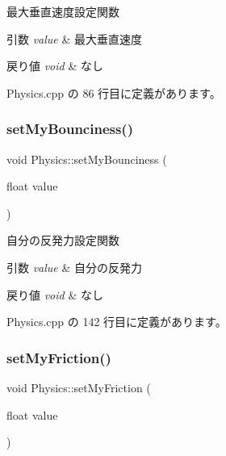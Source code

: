 最大垂直速度設定関数 


\begin{DoxyParams}{引数}
{\em value} & 最大垂直速度 \\
\hline
\end{DoxyParams}

\begin{DoxyRetVals}{戻り値}
{\em void} & なし \\
\hline
\end{DoxyRetVals}


 Physics.\+cpp の 86 行目に定義があります。

\mbox{\label{class_physics_a4e23a9b6f9888b22d3043ea8463fbd37}} 
\subsubsection{\texorpdfstring{set\+My\+Bounciness()}{setMyBounciness()}}
{\footnotesize\ttfamily void Physics\+::set\+My\+Bounciness (\begin{DoxyParamCaption}\item[{float}]{value }\end{DoxyParamCaption})}



自分の反発力設定関数 


\begin{DoxyParams}{引数}
{\em value} & 自分の反発力 \\
\hline
\end{DoxyParams}

\begin{DoxyRetVals}{戻り値}
{\em void} & なし \\
\hline
\end{DoxyRetVals}


 Physics.\+cpp の 142 行目に定義があります。

\mbox{\label{class_physics_a848d75133a2c2f46a73c8439f29297c5}} 
\subsubsection{\texorpdfstring{set\+My\+Friction()}{setMyFriction()}}
{\footnotesize\ttfamily void Physics\+::set\+My\+Friction (\begin{DoxyParamCaption}\item[{float}]{value }\end{DoxyParamCaption})}



